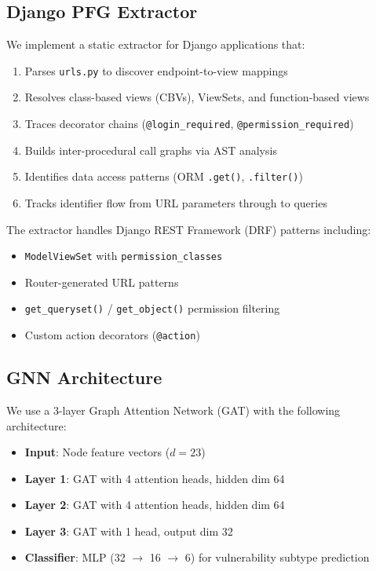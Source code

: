 \documentclass[conference]{IEEEtran}
\begin{document}
\subsection{Django PFG Extractor}

We implement a static extractor for Django applications that:

\begin{enumerate}
    \item Parses \texttt{urls.py} to discover endpoint-to-view mappings
    \item Resolves class-based views (CBVs), ViewSets, and function-based views
    \item Traces decorator chains (\texttt{@login\_required}, \texttt{@permission\_required})
    \item Builds inter-procedural call graphs via AST analysis
    \item Identifies data access patterns (ORM \texttt{.get()}, \texttt{.filter()})
    \item Tracks identifier flow from URL parameters through to queries
\end{enumerate}

The extractor handles Django REST Framework (DRF) patterns including:
\begin{itemize}
    \item \texttt{ModelViewSet} with \texttt{permission\_classes}
    \item Router-generated URL patterns
    \item \texttt{get\_queryset()} / \texttt{get\_object()} permission filtering
    \item Custom action decorators (\texttt{@action})
\end{itemize}

\subsection{GNN Architecture}

We use a 3-layer Graph Attention Network (GAT) with the following architecture:

\begin{itemize}
    \item \textbf{Input}: Node feature vectors ($d=23$)
    \item \textbf{Layer 1}: GAT with 4 attention heads, hidden dim 64
    \item \textbf{Layer 2}: GAT with 4 attention heads, hidden dim 64
    \item \textbf{Layer 3}: GAT with 1 head, output dim 32
    \item \textbf{Classifier}: MLP (32 $\rightarrow$ 16 $\rightarrow$ 6) for vulnerability subtype prediction
\end{itemize}
\end{document}
